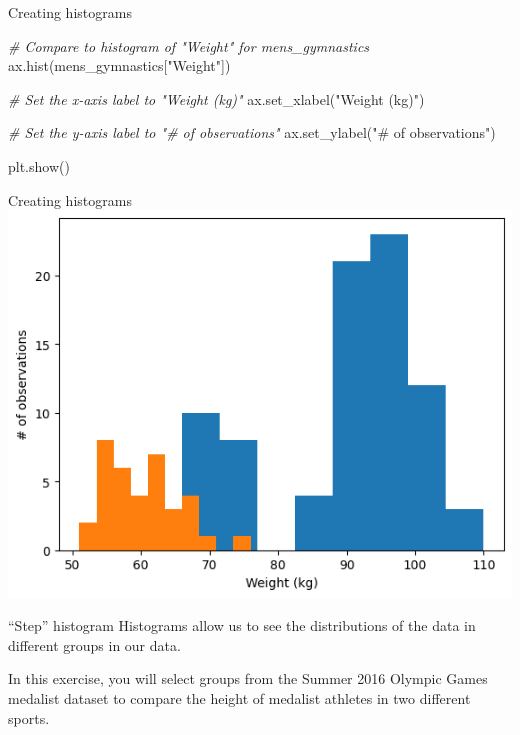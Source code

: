 \documentclass[
  ignorenonframetext,
]{beamer}
\newenvironment{Shaded}{\begin{snugshade}}{\end{snugshade}}
\newcommand{\CommentTok}[1]{\textcolor[rgb]{0.56,0.35,0.01}{\textit{#1}}}
\newcommand{\NormalTok}[1]{#1}
\newcommand{\StringTok}[1]{\textcolor[rgb]{0.31,0.60,0.02}{#1}}
\begin{document}
\begin{frame}[fragile]{Creating histograms}
\label{creating-histograms-3}

\begin{Shaded}
\begin{Highlighting}[]
\CommentTok{\# Compare to histogram of "Weight" for mens\_gymnastics}
\NormalTok{ax.hist(mens\_gymnastics[}\StringTok{"Weight"}\NormalTok{])}

\CommentTok{\# Set the x{-}axis label to "Weight (kg)"}
\NormalTok{ax.set\_xlabel(}\StringTok{"Weight (kg)"}\NormalTok{)}

\CommentTok{\# Set the y{-}axis label to "\# of observations"}
\NormalTok{ax.set\_ylabel(}\StringTok{"\# of observations"}\NormalTok{)}

\NormalTok{plt.show()}
\end{Highlighting}
\end{Shaded}
\end{frame}

\begin{frame}{Creating histograms}
\label{creating-histograms-4}
\includegraphics{../images/im242.png}
\end{frame}

\begin{frame}{``Step'' histogram}
\label{step-histogram}
Histograms allow us to see the distributions of the data in different
groups in our data.

In this exercise, you will select groups from the Summer 2016 Olympic
Games medalist dataset to compare the height of medalist athletes in two
different sports.
\end{frame}
\end{document}
